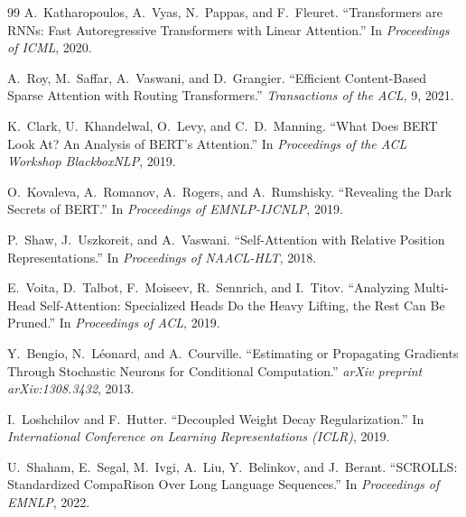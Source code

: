 \begin{thebibliography}{99}
A.~Katharopoulos, A.~Vyas, N.~Pappas, and F.~Fleuret.
``Transformers are RNNs: Fast Autoregressive Transformers with Linear Attention.''
In \textit{Proceedings of ICML}, 2020.

A.~Roy, M.~Saffar, A.~Vaswani, and D.~Grangier.
``Efficient Content-Based Sparse Attention with Routing Transformers.''
\textit{Transactions of the ACL}, 9, 2021.

K.~Clark, U.~Khandelwal, O.~Levy, and C.~D.~Manning.
``What Does BERT Look At? An Analysis of BERT's Attention.''
In \textit{Proceedings of the ACL Workshop BlackboxNLP}, 2019.

O.~Kovaleva, A.~Romanov, A.~Rogers, and A.~Rumshisky.
``Revealing the Dark Secrets of BERT.''
In \textit{Proceedings of EMNLP-IJCNLP}, 2019.

P.~Shaw, J.~Uszkoreit, and A.~Vaswani.
``Self-Attention with Relative Position Representations.''
In \textit{Proceedings of NAACL-HLT}, 2018.

E.~Voita, D.~Talbot, F.~Moiseev, R.~Sennrich, and I.~Titov.
``Analyzing Multi-Head Self-Attention: Specialized Heads Do the Heavy Lifting,
  the Rest Can Be Pruned.''
In \textit{Proceedings of ACL}, 2019.

Y.~Bengio, N.~Léonard, and A.~Courville.
``Estimating or Propagating Gradients Through Stochastic Neurons for Conditional
  Computation.''
\textit{arXiv preprint arXiv:1308.3432}, 2013.

I.~Loshchilov and F.~Hutter.
``Decoupled Weight Decay Regularization.''
In \textit{International Conference on Learning Representations (ICLR)}, 2019.

U.~Shaham, E.~Segal, M.~Ivgi, A.~Liu, Y.~Belinkov, and J.~Berant.
``SCROLLS: Standardized CompaRison Over Long Language Sequences.''
In \textit{Proceedings of EMNLP}, 2022.

\end{thebibliography}
